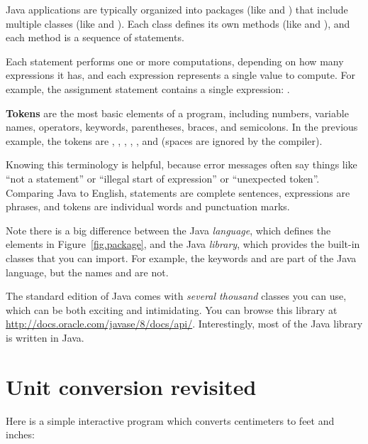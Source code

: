 
Java applications are typically organized into packages (like  and ) that include multiple classes (like  and ).
Each class defines its own methods (like  and ), and each method is a sequence of statements.

Each statement performs one or more computations, depending on how many expressions it has, and each expression represents a single value to compute.
For example, the assignment statement  contains a single expression: .

{\bf Tokens} are the most basic elements of a program, including numbers, variable names, operators, keywords, parentheses, braces, and semicolons.
In the previous example, the tokens are , \java{=}, , \java{/}, , and \java{;} (spaces are ignored by the compiler).


Knowing this terminology is helpful, because error messages often say things like ``not a statement'' or ``illegal start of expression'' or ``unexpected token''.
Comparing Java to English, statements are complete sentences, expressions are phrases, and tokens are individual words and punctuation marks.

Note there is a big difference between the Java {\em language}, which defines the elements in Figure~\ref{fig.package}, and the Java {\em library}, which provides the built-in classes that you can import.
For example, the keywords  and  are part of the Java language, but the names  and  are not.

The standard edition of Java comes with {\em several thousand} classes you can use, which can be both exciting and intimidating.
You can browse this library at \url{http://docs.oracle.com/javase/8/docs/api/}.
Interestingly, most of the Java library is written in Java.

\section{Unit conversion revisited}

Here is a simple interactive program which converts centimeters to feet and inches:


